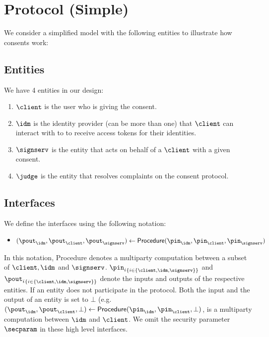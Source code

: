 

\section{Protocol (Simple)}
We consider a simplified model with the following entities to illustrate how consents work:

\subsection{Entities}
We have 4 entities in our design:
\begin{enumerate}
    \item $\client$ is the user who is giving the consent.
    \item $\idm$ is the identity provider (can be more than one) that $\client$ can interact with to to receive access tokens for their identities.
    \item $\signserv$ is the entity that acts on behalf of a $\client$ with a given consent.
    \item $\judge$ is the entity that resolves complaints on the consent protocol.
\end{enumerate}

\subsection{Interfaces}
We define the interfaces using the following notation:
\begin{itemize}
    \item $(\pout_\idm, \pout_\client, \pout_\signserv) \gets \mathsf{Procedure}(\pin_\idm, \pin_\client, \pin_\signserv)$
\end{itemize}

In this notation, \textsf{Procedure} denotes a multiparty computation between a subset of $\client, \idm$ and $\signserv$. ${\pin_{i}}_{\{i \in \{\client, \idm, \signserv\}\}}$ and ${\pout_{i}}_{\{i \in \{\client, \idm, \signserv\}\}}$ denote the inputs and outputs of the respective entities. If an entity does not participate in the protocol. Both the input and the output of an entity is set to $\bot$ (e.g. $(\pout_\idm, \pout_\client, \bot) \gets \mathsf{Procedure}(\pin_\idm, \pin_\client, \bot)$, is a multiparty computation between $\idm$ and $\client$. We omit the security parameter $\secparam$ in these high level interfaces.

